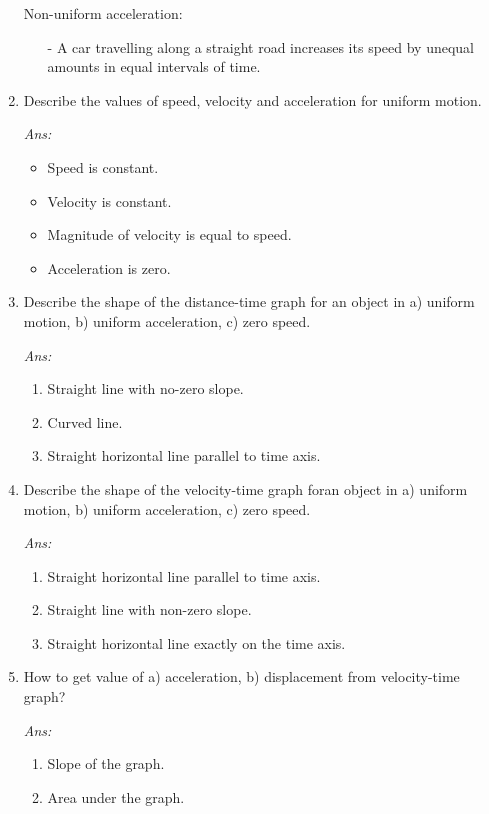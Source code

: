 \documentclass[12pt]{article}
\begin{document}
\begin{enumerate}
{\begin{itemize}
			\end{itemize}
			Non-uniform acceleration:
			\begin{itemize}
				\item[-] A car travelling along a straight road increases its speed by unequal amounts in equal intervals of time.
			\end{itemize}
		}
	\item Describe the values of speed, velocity and acceleration for uniform motion.
		{\itshape Ans: 
			\begin{itemize}
				\item Speed is constant.
				\item Velocity is constant.
				\item Magnitude of velocity is equal to speed.
				\item Acceleration is zero.
			\end{itemize}
		}
	\item Describe the shape of the distance-time graph for an object in a) uniform motion, b) uniform acceleration, c) zero speed. \\
		{\itshape Ans: 
			\begin{enumerate}
				\item Straight line with no-zero slope.
				\item Curved line.
				\item Straight horizontal line parallel to time axis.
			\end{enumerate}
		}
	\item Describe the shape of the velocity-time graph foran object in a) uniform motion, b) uniform acceleration, c) zero speed. \\
		{\itshape Ans: 
			\begin{enumerate}
				\item Straight horizontal line parallel to time axis.
				\item Straight line with non-zero slope.
				\item Straight horizontal line exactly on the time axis.
			\end{enumerate}
		}
	\item How to get value of a) acceleration, b) displacement from velocity-time graph? \\
		{\itshape Ans: 
			\begin{enumerate}
				\item Slope of the graph.
				\item Area under the graph.
			\end{enumerate}
}
\end{enumerate}
\end{document}
